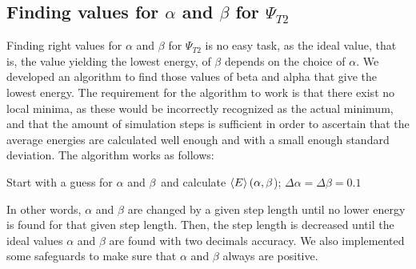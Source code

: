 \documentclass[10pt,a4paper]{article}
\begin{document}
\subsection{Finding values for $\alpha$ and $\beta$ for $\Psi_{T2}$}
Finding right values for $\alpha$ and $\beta$ for $\Psi_{T2}$ is no easy task, as the ideal value, that is, the value yielding the lowest energy, of $\beta$ depends on the choice of $\alpha$. We developed an algorithm to find those values of beta and alpha that give the lowest energy. The requirement for the algorithm to work is that there exist no local minima, as these would be incorrectly recognized as the actual minimum, and that the amount of simulation steps is sufficient in order to ascertain that the average energies are calculated well enough and with a small enough standard deviation. 
The algorithm works as follows:\\
\IncMargin{1em}
\begin{algorithm}[H]  
    Start with a guess for $\alpha$ and $\beta$\ and calculate $\braket{E}(\alpha,\beta$);
    $\Delta\alpha=\Delta\beta=0.1$\;
\end{algorithm}
\DecMargin{1em}
In other words, $\alpha$ and $\beta$ are changed by a given step length until no lower energy is found  for that given step length. Then, the step length is decreased until the ideal values $\alpha$ and $\beta$ are found with two decimals accuracy. We also implemented some safeguards to make sure that $\alpha$ and $\beta$ always are positive.
\end{document}
